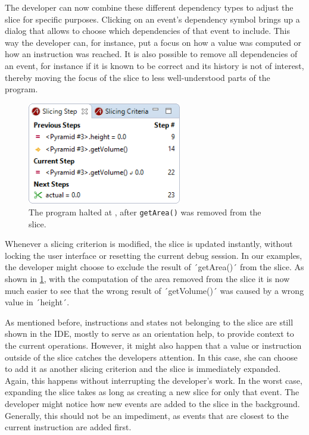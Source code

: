 ﻿\documentclass[
      english,
      ]{llncs}
\begin{document}
The developer can now combine these different dependency types to adjust the slice for specific purposes.
Clicking on an event's dependency symbol brings up a dialog that allows to choose which dependencies of that event to include.
This way the developer can, for instance, put a focus on how a value was computed or how an instruction was reached.
It is also possible to remove all dependencies of an event, for instance if it is known to be correct and its history is not of interest, thereby moving the focus of the slice to less well-understood parts of the program.

\begin{figure}
	\centering
		\includegraphics[width=0.60\textwidth]{slice2.png}
	\caption{The program halted at , after \lstinline{getArea()} was removed from the slice.}
	\label{fig:slice2}
\end{figure}

Whenever a slicing criterion is modified, the slice is updated instantly, without locking the user interface or resetting the current debug session.
In our examples, the developer might choose to exclude the result of ´getArea()´ from the slice. 
As shown in \cref{fig:slice2}, with the computation of the area removed from the slice it is now much easier to see that the wrong result of ´getVolume()´ was caused by a wrong value in ´height´.


As mentioned before, instructions and states not belonging to the slice are still shown in the IDE, mostly to serve as an orientation help, to provide context to the current operations.
However, it might also happen that a value or instruction outside of the slice catches the developers attention.
In this case, she can choose to add it as another slicing criterion and the slice is immediately expanded.
Again, this happens without interrupting the developer's work.
In the worst case, expanding the slice takes as long as creating a new slice for only that event.
The developer might notice how new events are added to the slice in the background.
Generally, this should not be an impediment, as events that are closest to the current instruction are added first.
\end{document}
